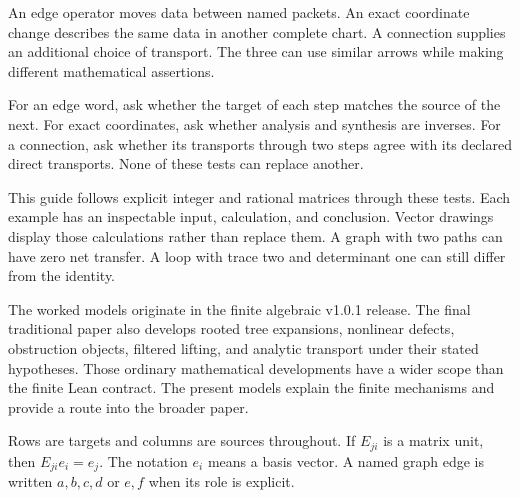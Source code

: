 An edge operator moves data between named packets. An exact coordinate change describes the same data in another complete chart. A connection supplies an additional choice of transport. The three can use similar arrows while making different mathematical assertions.


For an edge word, ask whether the target of each step matches the source of the next. For exact coordinates, ask whether analysis and synthesis are inverses. For a connection, ask whether its transports through two steps agree with its declared direct transports. None of these tests can replace another.

This guide follows explicit integer and rational matrices through these tests. Each example has an inspectable input, calculation, and conclusion. Vector drawings display those calculations rather than replace them. A graph with two paths can have zero net transfer. A loop with trace two and determinant one can still differ from the identity.

The worked models originate in the finite algebraic v1.0.1 release. The final traditional paper also develops rooted tree expansions, nonlinear defects, obstruction objects, filtered lifting, and analytic transport under their stated hypotheses. Those ordinary mathematical developments have a wider scope than the finite Lean contract. The present models explain the finite mechanisms and provide a route into the broader paper.


Rows are targets and columns are sources throughout. If $E_{ji}$ is a matrix unit, then $E_{ji}e_i=e_j$. The notation $e_i$ means a basis vector. A named graph edge is written $a,b,c,d$ or $e,f$ when its role is explicit.

